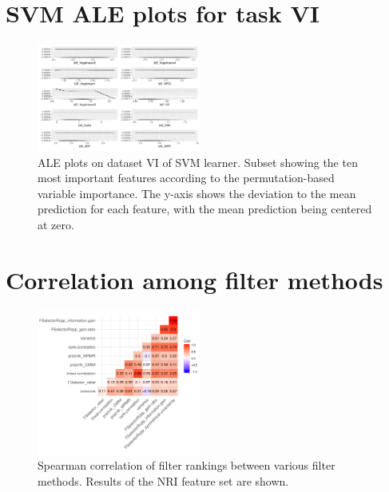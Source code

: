 \documentclass[letterpaper, peerreview]{IEEEtran}
\begin{document}
\section{SVM ALE plots for task VI}

\begin{figure} [ht]
	\begin{center}
		\includegraphics[width=0.48\textwidth] {fi-vi-ale-1.pdf}
		\caption{ALE plots on dataset VI of SVM learner. Subset showing the ten most important features according to the permutation-based variable importance. The y-axis shows the deviation to the mean prediction for each feature, with the mean prediction being centered at zero.}\label{fig:fi-vi-ale}
	\end{center}
\end{figure}

\section{Correlation among filter methods}

\pagebreak

\begin{figure} [ht]
	\begin{center}
		\includegraphics[width=0.48\textwidth] {correlation-filter-nri-1.pdf}
		\caption{Spearman correlation of filter rankings between various filter methods. Results of the NRI feature set are shown.}\label{fig:correlation-filters}
	\end{center}
\end{figure}
\end{document}
